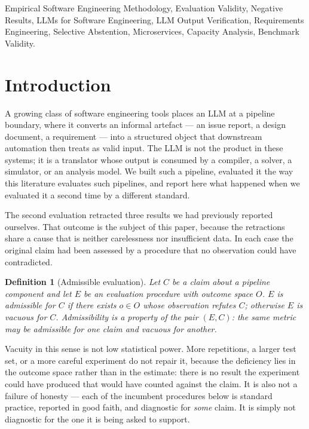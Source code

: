 \documentclass[journal, 10pt]{IEEEtran}
\newtheorem{definition}{Definition}
\begin{document}
\begin{IEEEkeywords}
Empirical Software Engineering Methodology, Evaluation Validity, Negative Results, LLMs for Software Engineering, LLM Output Verification, Requirements Engineering, Selective Abstention, Microservices, Capacity Analysis, Benchmark Validity.
\end{IEEEkeywords}

\section{Introduction}
\label{sec:introduction}

A growing class of software engineering tools places an LLM at a pipeline
boundary, where it converts an informal artefact --- an issue report, a design
document, a requirement --- into a structured object that downstream automation
then treats as valid input. The LLM is not the product in these systems; it is a
translator whose output is consumed by a compiler, a solver, a simulator, or an
analysis model. We built such a pipeline, evaluated it the way this literature
evaluates such pipelines, and report here what happened when we evaluated it a
second time by a different standard.

The second evaluation retracted three results we had previously reported
ourselves. That outcome is the subject of this paper, because the retractions
share a cause that is neither carelessness nor insufficient data. In each case
the original claim had been assessed by a procedure that no observation could
have contradicted.

\begin{definition}[Admissible evaluation]
\label{def:admissible}
Let $C$ be a claim about a pipeline component and let $E$ be an evaluation
procedure with outcome space $O$. $E$ is \emph{admissible} for $C$ if there
exists $o \in O$ whose observation refutes $C$; otherwise $E$ is \emph{vacuous}
for $C$. Admissibility is a property of the pair $(E,C)$: the same metric may be
admissible for one claim and vacuous for another.
\end{definition}

Vacuity in this sense is not low statistical power. More repetitions, a larger
test set, or a more careful experiment do not repair it, because the deficiency
lies in the outcome space rather than in the estimate: there is no result the
experiment could have produced that would have counted against the claim. It is
also not a failure of honesty --- each of the incumbent procedures below is
standard practice, reported in good faith, and diagnostic for \emph{some} claim.
It is simply not diagnostic for the one it is being asked to support.
\end{document}
